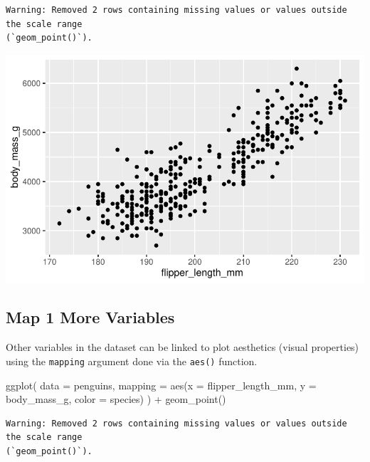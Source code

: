 \documentclass[
  letterpaper,
  DIV=11,
  numbers=noendperiod]{scrreprt}
\newenvironment{Shaded}{\begin{snugshade}}{\end{snugshade}}
\newcommand{\AttributeTok}[1]{\textcolor[rgb]{0.40,0.45,0.13}{#1}}
\newcommand{\FunctionTok}[1]{\textcolor[rgb]{0.28,0.35,0.67}{#1}}
\newcommand{\NormalTok}[1]{\textcolor[rgb]{0.00,0.23,0.31}{#1}}
\newcommand{\SpecialCharTok}[1]{\textcolor[rgb]{0.37,0.37,0.37}{#1}}
\begin{document}
\begin{verbatim}
Warning: Removed 2 rows containing missing values or values outside the scale range
(`geom_point()`).
\end{verbatim}

\includegraphics{src/r-for-data-science/01-data-viz_files/figure-pdf/unnamed-chunk-7-1.pdf}

\subsection{Map 1 More Variables}\label{map-1-more-variables}

Other variables in the dataset can be linked to plot aesthetics (visual
properties) using the \texttt{mapping} argument done via the
\texttt{aes()} function.

\begin{Shaded}
\begin{Highlighting}[]
\FunctionTok{ggplot}\NormalTok{(}
  \AttributeTok{data =}\NormalTok{ penguins,}
  \AttributeTok{mapping =} \FunctionTok{aes}\NormalTok{(}\AttributeTok{x =}\NormalTok{ flipper\_length\_mm, }\AttributeTok{y =}\NormalTok{ body\_mass\_g, }\AttributeTok{color =}\NormalTok{ species)}
\NormalTok{) }\SpecialCharTok{+}
  \FunctionTok{geom\_point}\NormalTok{()}
\end{Highlighting}
\end{Shaded}

\begin{verbatim}
Warning: Removed 2 rows containing missing values or values outside the scale range
(`geom_point()`).
\end{verbatim}
\end{document}
